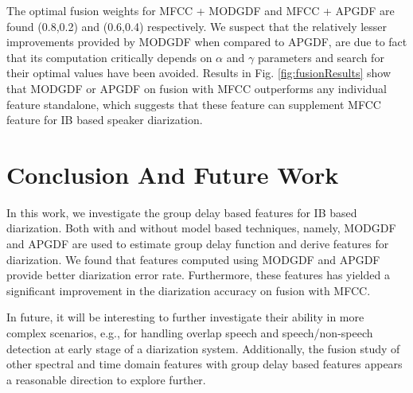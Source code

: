 \documentclass[conference]{IEEEtran}
\begin{document}
The optimal fusion weights for MFCC + MODGDF and MFCC + APGDF are found (0.8,0.2) and
(0.6,0.4) respectively. We suspect that the relatively lesser improvements provided by
MODGDF when compared to APGDF, are due to fact that its computation critically depends on $\alpha$ and $\gamma$ parameters and search for their optimal values have been avoided. 
Results in Fig. \ref{fig:fusionResults} show that MODGDF or APGDF on fusion with MFCC outperforms any individual feature standalone, which suggests that these feature can supplement MFCC feature for IB based speaker diarization.

\section{Conclusion And Future Work}
\label{conclude}

In this work, we investigate the group delay based features for IB based
diarization. Both with and without model based techniques, namely,
MODGDF and APGDF are used to estimate group delay function and derive features for diarization. 
We found that features computed using MODGDF and APGDF provide better diarization error rate. 
Furthermore, these features has yielded a significant improvement in the diarization accuracy 
on fusion with MFCC. 

In future, it will be interesting to further investigate their ability in
more complex scenarios, e.g., for handling overlap speech and speech/non-speech
detection at early stage of a diarization system. Additionally, the fusion study of
other spectral and time domain features with group delay based features appears
a reasonable direction to explore further. 



\end{document}
